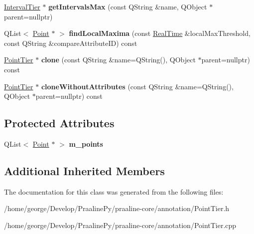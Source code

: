 \begin{DoxyCompactItemize}
\item 
\mbox{\label{class_point_tier_ac4d4bb5e268e247d29c2241d438a9e8b}} 
\hyperlink{class_interval_tier}{Interval\+Tier} $\ast$ {\bfseries get\+Intervals\+Max} (const Q\+String \&name, Q\+Object $\ast$parent=nullptr)
\item 
\mbox{\label{class_point_tier_aaa29377ffa96a4fb100d56ff6d4257d8}} 
Q\+List$<$ \hyperlink{class_point}{Point} $\ast$ $>$ {\bfseries find\+Local\+Maxima} (const \hyperlink{struct_real_time}{Real\+Time} \&local\+Max\+Threshold, const Q\+String \&compare\+Attribute\+ID) const
\item 
\mbox{\label{class_point_tier_a8d27fdc79cb1347e422470b6c1272cbc}} 
\hyperlink{class_point_tier}{Point\+Tier} $\ast$ {\bfseries clone} (const Q\+String \&name=Q\+String(), Q\+Object $\ast$parent=nullptr) const
\item 
\mbox{\label{class_point_tier_af1a0ab3f4643f048ca87273b02ae4fba}} 
\hyperlink{class_point_tier}{Point\+Tier} $\ast$ {\bfseries clone\+Without\+Attributes} (const Q\+String \&name=Q\+String(), Q\+Object $\ast$parent=nullptr) const
\end{DoxyCompactItemize}
\subsection*{Protected Attributes}
\begin{DoxyCompactItemize}
\item 
\mbox{\label{class_point_tier_a9482b0862c09afaecdec17e129560291}} 
Q\+List$<$ \hyperlink{class_point}{Point} $\ast$ $>$ {\bfseries m\+\_\+points}
\end{DoxyCompactItemize}
\subsection*{Additional Inherited Members}


The documentation for this class was generated from the following files\+:\begin{DoxyCompactItemize}
\item 
/home/george/\+Develop/\+Praaline\+Py/praaline-\/core/annotation/Point\+Tier.\+h\item 
/home/george/\+Develop/\+Praaline\+Py/praaline-\/core/annotation/Point\+Tier.\+cpp\end{DoxyCompactItemize}
